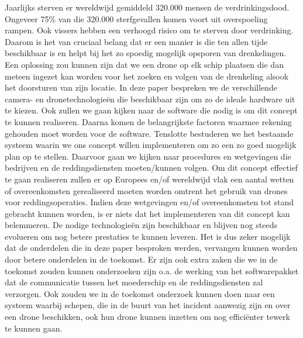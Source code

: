 Jaarlijks sterven er wereldwijd gemiddeld 320.000 mensen de verdrinkingsdood. Ongeveer 75\% van die 320.000 sterfgevallen komen voort uit overspoeling rampen. Ook vissers hebben een verhoogd risico om te sterven door verdrinking. Daarom is het van cruciaal belang dat er een manier is die ten allen tijde beschikbaar is en helpt bij het zo spoedig mogelijk opsporen van drenkelingen. Een oplossing zou kunnen zijn dat we een drone op elk schip plaatsen die dan meteen ingezet kan worden voor het zoeken en volgen van de drenkeling alsook het doorsturen van zijn locatie. In deze paper bespreken we de verschillende camera- en dronetechnologieën die beschikbaar zijn om zo de ideale hardware uit te kiezen. Ook zullen we gaan kijken naar de software die nodig is om dit concept te kunnen realiseren. Daarna komen de belangrijkste factoren waarmee rekening gehouden moet worden voor de software.
Tenslotte bestuderen we het bestaande systeem waarin we ons concept willen implementeren om zo een zo goed mogelijk plan op te stellen. Daarvoor gaan we kijken naar procedures en wetgevingen die bedrijven en de reddingsdiensten moeten/kunnen volgen. Om dit concept effectief te gaan realiseren zullen er op Europees en/of wereldwijd vlak een aantal wetten of overeenkomsten gerealiseerd moeten worden omtrent het gebruik van drones voor reddingsoperaties. Indien deze wetgevingen en/of overeenkomsten tot stand gebracht kunnen worden, is er niets dat het implementeren van dit concept kan belemmeren. De nodige technologieën zijn beschikbaar en blijven nog steeds evolueren om nog betere prestaties te kunnen leveren. Het is dus zeker mogelijk dat de onderdelen die in deze paper besproken werden, vervangen kunnen worden door betere onderdelen in de toekomst. Er zijn ook extra zaken die we in de toekomst zouden kunnen onderzoeken zijn o.a. de werking van het softwarepakket dat de communicatie tussen het moederschip en de reddingsdiensten zal verzorgen. Ook zouden we in de toekomst onderzoek kunnen doen naar een systeem waarbij schepen, die in de buurt van het incident aanwezig zijn en over een drone beschikken, ook hun drone kunnen inzetten om nog efficiënter tewerk te kunnen gaan.
